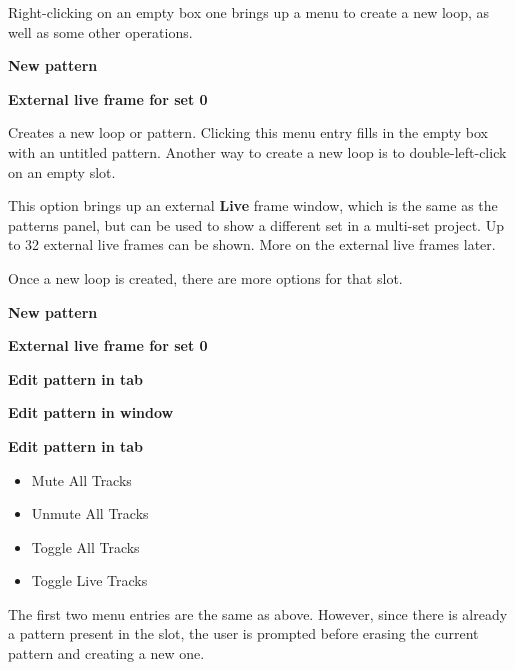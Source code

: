    Right-clicking on an empty box one brings up a menu to create
   a new loop, as well as some other operations.

   \begin{enumber}
      \item \textbf{New pattern}
      \item \textbf{External live frame for set 0}
   \end{enumber}

   \setcounter{ItemCounter}{0}      %

   Creates a new loop or pattern.
   Clicking this menu entry fills in the empty box with an untitled
   pattern.  Another way to create a new loop is to double-left-click on an
   empty slot.

   This option brings up an external \textbf{Live} frame window, which
   is the same as the patterns panel, but can be used to show a different set
   in a multi-set project.  Up to 32 external live frames can be shown.
   More on the external live frames later.

   Once a new loop is created, there are more options for that slot.

   \begin{enumber}
      \item \textbf{New pattern}
      \item \textbf{External live frame for set 0}
      \item \textbf{Edit pattern in tab}
      \item \textbf{Edit pattern in window}
      \item \textbf{Edit pattern in tab}
      \begin{itemize}
         \item {Mute All Tracks}
         \item {Unmute All Tracks}
         \item {Toggle All Tracks}
         \item {Toggle Live Tracks}
      \end{itemize}
   \end{enumber}

   The first two menu entries are the same as above.  However, since there is
   already a pattern present in the slot, the user is prompted before erasing
   the current pattern and creating a new one.

